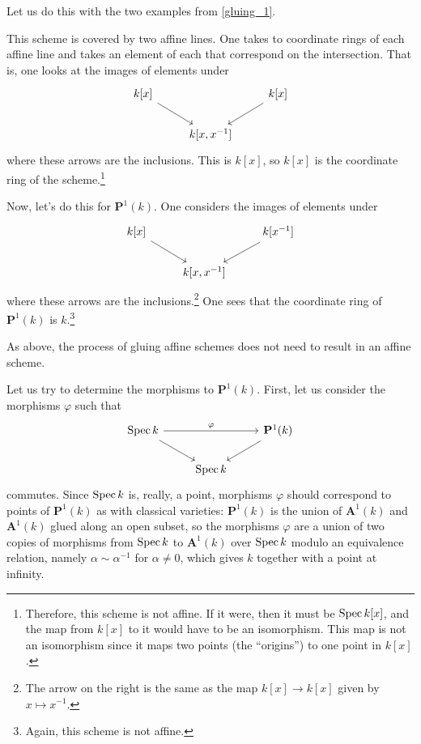 \documentclass [11 pt, oneside, margin = 1 in] {article}
\begin{document}
Let us do this with the two examples from \cref{gluing_1}.

\begin{example}\label{}\text{}
This scheme is covered by two affine lines. One takes to coordinate rings of each affine line and takes an element of each that correspond on the intersection. That is, one looks at the images of elements under
\[
\begin{tikzcd}
	k[x]\ar[dr] && k[x] \ar[dl]\\
	&k[x,x^{-1}]
\end{tikzcd}
\]
where these arrows are the inclusions. This is $k[x]$, so $k[x]$ is the coordinate ring of the scheme.\footnote{Therefore, this scheme is not affine. If it were, then it must be $\operatorname{Spec} k[x]$, and the map from $k[x]$ to it would have to be an isomorphism. This map is not an isomorphism since it maps two points (the ``origins'') to one point in $k[x]$.}
\end{example}

\begin{example}[ ]\label{}\text{}
Now, let's do this for $\mathbf{P}^1(k)$. One considers the images of elements under
\[
\begin{tikzcd}
        k[x]\ar[dr] && k[x^{-1}] \ar[dl]\\
        &k[x,x^{-1}]
\end{tikzcd}
\]
where these arrows are the inclusions.\footnote{The arrow on the right is the same as the map $k[x]\longrightarrow k[x]$ given by $x\longmapsto x^{-1}$.} One sees that the coordinate ring of $\mathbf{P}^1(k)$ is $k$.\footnote{Again, this scheme is not affine.}
\end{example}

\begin{remark}
	As above, the process of gluing affine schemes does not need to result in an affine scheme.
\end{remark}

Let us try to determine the morphisms to $\mathbf{P}^1(k)$. First, let us consider the morphisms $\varphi$ such that 
\[
\begin{tikzcd}
	\Spec k \ar[dr]\ar[rr,"\varphi"] && \mathbf{P}^1(k)\ar[dl]\\
					 &\Spec k
\end{tikzcd}
\]
commutes. Since $\operatorname{Spec} k$ is, really, a point, morphisms $\varphi$ should correspond to points of $\mathbf{P}^1(k)$ as with classical varieties: $\mathbf{P}^1(k)$ is the union of $\mathbf{A}^1(k)$ and $\mathbf{A}^1(k)$ glued along an open subset, so the morphisms $\varphi$ are a union of two copies of morphisms from $\operatorname{Spec} k$ to $\mathbf{A}^1(k)$ over $\operatorname{Spec} k$ modulo an equivalence relation, namely $\alpha\sim \alpha ^{-1}$ for $\alpha\ne 0$, which gives $k$ together with a point at infinity.
\end{document}
